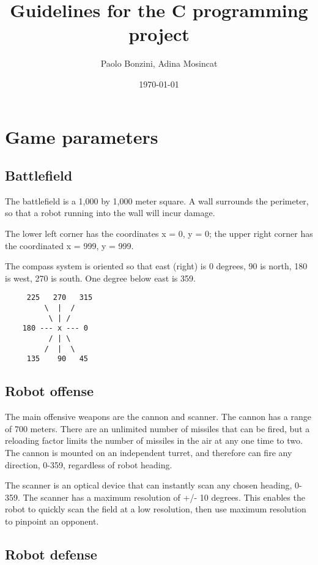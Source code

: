 \documentclass{article}
\title{Guidelines for the C programming project}
\author{Paolo Bonzini, Adina Mosincat}
\date{\today}
\begin{document}
\maketitle

\section{Game parameters}

\subsection{Battlefield}

        The battlefield is a 1,000 by 1,000 meter square.  A wall
        surrounds the perimeter, so that a robot running into the wall
        will incur damage.

        The lower left corner has the coordinates x = 0, y = 0; the upper
        right corner has the coordinated x = 999, y = 999.

        The compass system is oriented so that east (right) is 0
        degrees, 90 is north, 180 is west, 270 is south.  One degree
        below east is 359.


\begin{verbatim}
     225   270   315
         \  |  / 
          \ | /
    180 --- x --- 0
          / | \
         /  |  \ 
     135    90   45
\end{verbatim}


\subsection{Robot offense}

        The main offensive weapons are the cannon and scanner.  The
        cannon has a range of 700 meters.  There are an unlimited number
        of missiles that can be fired, but a reloading factor limits the
        number of missiles in the air at any one time to two.  The cannon
        is mounted on an independent turret, and therefore can fire any
        direction, 0-359, regardless of robot heading.

        The scanner is an optical device that can instantly scan any
        chosen heading, 0-359.  The scanner has a maximum resolution of  
        +/- 10 degrees.  This enables the robot to quickly scan the field
        at a low resolution, then use maximum resolution to pinpoint an
        opponent.


\subsection{Robot defense }
\end{document}
